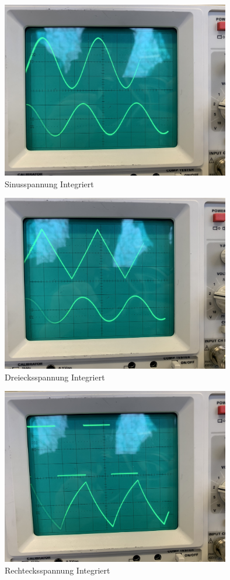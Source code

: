 \begin{figure}
  \centering
  \includegraphics[width = 10cm]{V353foto1.pdf}
  \caption{Sinusspannung Integriert}
  \label{fig:int1}
\end{figure}
\begin{figure}
  \centering
  \includegraphics[width = 10cm]{V353foto2.pdf}
  \caption{Dreiecksspannung Integriert}
  \label{fig:int2}
\end{figure}
\begin{figure}
  \centering
  \includegraphics[width = 10cm]{V353foto3.pdf}
  \caption{Rechtecksspannung Integriert}
  \label{fig:int3}
\end{figure}









